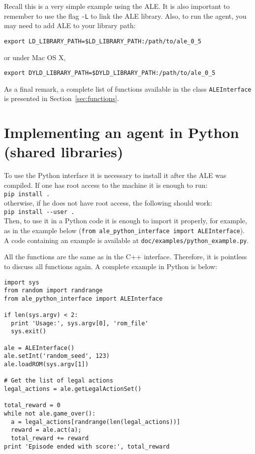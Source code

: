 \documentclass[12pt]{article}
\begin{document}
Recall this is a very simple example using the ALE. It is also important to remember to use the flag 
\verb+-L+ to link the ALE library. Also, to run the agent, you may need to add ALE to your library
path:

\begin{verbatim}
export LD_LIBRARY_PATH=$LD_LIBRARY_PATH:/path/to/ale_0_5
\end{verbatim}

or under Mac OS X,

\begin{verbatim}
export DYLD_LIBRARY_PATH=$DYLD_LIBRARY_PATH:/path/to/ale_0_5
\end{verbatim}

As a final remark, a complete list of functions available in the class \verb+ALEInterface+ is 
presented in Section~\ref{sec:functions}.

\section{Implementing an agent in Python (shared libraries)}\label{sec:python_interface}

To use the Python interface it is necessary to install it after the ALE was compiled. If one has 
root access to the machine it is enough to run:\\

\verb+pip install .+\\

otherwise, if he does not have root access, the following should work:\\

\verb+pip install --user .+\\

Then, to use it in a Python code it is enough to import it properly, for example, as in the 
example below (\verb+from ale_python_interface import ALEInterface+). A code containing
an example is available at \verb+doc/examples/python_example.py+.

All the functions are the same as in the C++ interface. Therefore, it is pointless to discuss all
functions again. A complete example in Python is below:

\begin{verbatim}
import sys
from random import randrange
from ale_python_interface import ALEInterface

if len(sys.argv) < 2:
  print 'Usage:', sys.argv[0], 'rom_file'
  sys.exit()

ale = ALEInterface()
ale.setInt('random_seed', 123)
ale.loadROM(sys.argv[1])

# Get the list of legal actions
legal_actions = ale.getLegalActionSet()

total_reward = 0
while not ale.game_over():
  a = legal_actions[randrange(len(legal_actions))]
  reward = ale.act(a);
  total_reward += reward
print 'Episode ended with score:', total_reward
\end{verbatim}
\end{document}
